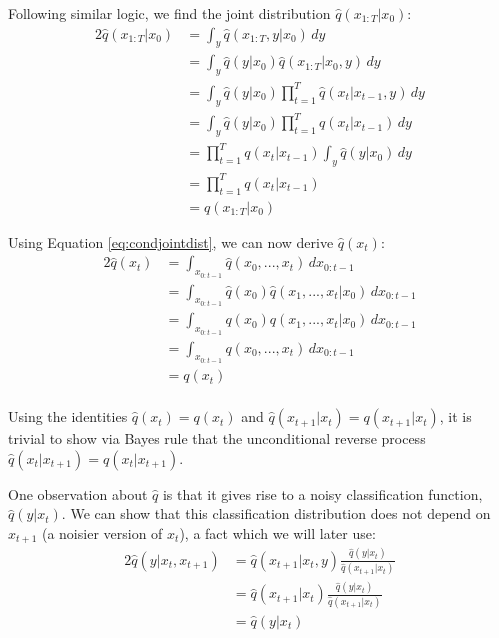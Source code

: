\documentclass{article}
\begin{document}
Following similar logic, we find the joint distribution $\hat{q}(x_{1:T}|x_0)$:
%
\begin{alignat}{2}
\hat{q}(x_{1:T}|x_0) &= \int_{y} \hat{q}(x_{1:T},y|x_0) \,dy \\
&= \int_{y} \hat{q}(y|x_0) \hat{q}(x_{1:T}|x_0,y) \,dy \\
&= \int_{y} \hat{q}(y|x_0) \prod_{t=1}^T \hat{q}(x_t|x_{t-1},y) \,dy \\
&= \int_{y} \hat{q}(y|x_0) \prod_{t=1}^T q(x_t|x_{t-1}) \,dy \\
&= \prod_{t=1}^T q(x_t|x_{t-1}) \int_{y} \hat{q}(y|x_0) \,dy \\
&= \prod_{t=1}^T q(x_t|x_{t-1}) \\
&= q(x_{1:T}|x_0) \label{eq:condjointdist}
\end{alignat}

Using Equation \ref{eq:condjointdist}, we can now derive $\hat{q}(x_t)$:
%
\begin{alignat}{2}
\hat{q}(x_t) &= \int_{x_{0:t-1}} \hat{q}(x_0, ..., x_t) \,dx_{0:t-1} \\
&= \int_{x_{0:t-1}} \hat{q}(x_0) \hat{q}(x_1,...,x_t|x_0) \,dx_{0:t-1} \\
&= \int_{x_{0:t-1}} q(x_0) q(x_1,...,x_t|x_0) \,dx_{0:t-1} \\
&= \int_{x_{0:t-1}} q(x_0,...,x_t) \,dx_{0:t-1} \\
&= q(x_t) \\
\end{alignat}

Using the identities $\hat q(x_t) = q(x_t)$ and $\hat q(x_{t+1}|x_t) = q(x_{t+1}|x_t)$, it is trivial to show via Bayes rule that the unconditional reverse process $\hat{q}(x_t|x_{t+1}) = q(x_t|x_{t+1})$.

One observation about $\hat{q}$ is that it gives rise to a noisy classification function, $\hat{q}(y|x_t)$. We can show that this classification distribution does not depend on $x_{t+1}$ (a noisier version of $x_t$), a fact which we will later use:
%
\begin{alignat}{2}
\hat{q}(y|x_t,x_{t+1}) &= \hat{q}(x_{t+1}|x_t,y) \frac{\hat{q}(y|x_t)}{\hat{q}(x_{t+1}|x_t)} \\
                 &= \hat{q}(x_{t+1}|x_t) \frac{\hat{q}(y|x_t)}{\hat{q}(x_{t+1}|x_t)} \\
                 &= \hat{q}(y|x_t) \\
\end{alignat}
\end{document}
